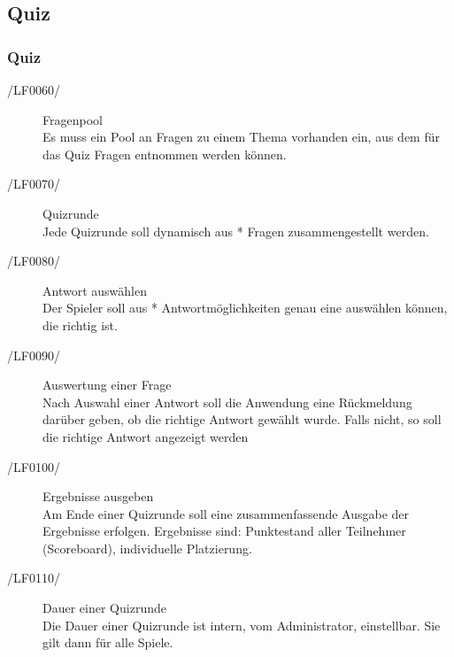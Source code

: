 \documentclass[11pt,a4paper]{scrreprt}
\begin{document}
\subsection{Quiz}
\subsubsection{Quiz}
\begin{description}
\item[/LF0060/] Fragenpool \\
Es muss ein Pool an Fragen zu einem Thema vorhanden ein, aus dem für das Quiz Fragen entnommen werden können.
\item[/LF0070/] Quizrunde \\
Jede Quizrunde soll dynamisch aus * Fragen zusammengestellt werden.
\item[/LF0080/] Antwort auswählen \\
Der Spieler soll aus * Antwortmöglichkeiten genau eine auswählen können, die richtig ist.
\item[/LF0090/]Auswertung einer Frage \\ 
Nach Auswahl einer Antwort soll die Anwendung eine Rückmeldung darüber geben, ob die richtige Antwort gewählt wurde. Falls nicht, so soll die richtige Antwort angezeigt werden %
\item[/LF0100/] Ergebnisse ausgeben \\
Am Ende einer Quizrunde soll eine zusammenfassende Ausgabe der Ergebnisse erfolgen. Ergebnisse sind: Punktestand aller Teilnehmer (Scoreboard),  individuelle Platzierung.
\item[/LF0110/] Dauer einer Quizrunde \\
 Die Dauer einer Quizrunde ist intern, vom Administrator, einstellbar. Sie gilt dann für alle Spiele.
\end{description}
\end{document}
